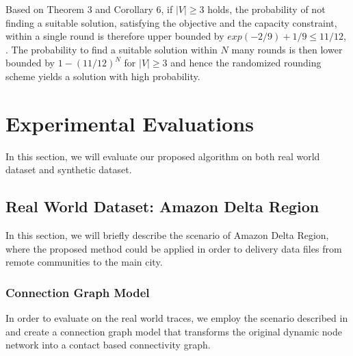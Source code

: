 \documentclass[conference]{IEEEtran}
\begin{document}
Based on Theorem 3 and Corollary 6, if $|V| \ge 3$ holds, the probability of not finding a suitable solution, satisfying the objective and the capacity constraint, within a single round is therefore upper bounded by $exp(−2/9) + 1/9 \le 11/12$, . The probability to find a suitable solution within $N$ many rounds is then lower bounded by $1 - (11/12)^N$ for $|V| \ge 3$ and hence the randomized rounding scheme yields a solution with high probability. 



\section{Experimental Evaluations}
In this section, we will evaluate our proposed algorithm on both real world dataset and synthetic dataset. 

\subsection{Real World Dataset: Amazon Delta Region}

In this section, we will briefly describe the scenario of Amazon Delta Region, where the proposed method could be applied in order to delivery data files from remote communities to the main city.

\subsubsection{Connection Graph Model}

In order to evaluate on the real world traces, we employ the scenario described in \cite{LiuJAERC15} and create a connection graph model that transforms the original dynamic node network into a contact based connectivity graph.
\end{document}
